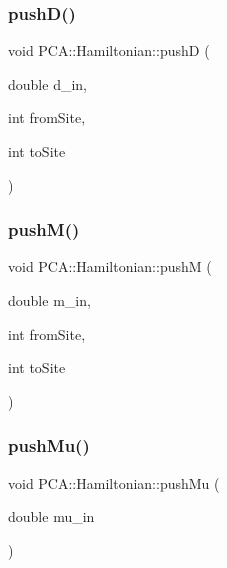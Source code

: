 \hypertarget{class_p_c_a_1_1_hamiltonian_a8f0f25f18c67f7943714d086737e427f}{}\label{class_p_c_a_1_1_hamiltonian_a8f0f25f18c67f7943714d086737e427f} 
\subsubsection{\texorpdfstring{push\+D()}{pushD()}}
{\footnotesize\ttfamily void P\+C\+A\+::\+Hamiltonian\+::pushD (\begin{DoxyParamCaption}\item[{double}]{d\+\_\+in,  }\item[{int}]{from\+Site,  }\item[{int}]{to\+Site }\end{DoxyParamCaption})}

\hypertarget{class_p_c_a_1_1_hamiltonian_a65c8f6848095abff386aa04a916b0c81}{}\label{class_p_c_a_1_1_hamiltonian_a65c8f6848095abff386aa04a916b0c81} 
\subsubsection{\texorpdfstring{push\+M()}{pushM()}}
{\footnotesize\ttfamily void P\+C\+A\+::\+Hamiltonian\+::pushM (\begin{DoxyParamCaption}\item[{double}]{m\+\_\+in,  }\item[{int}]{from\+Site,  }\item[{int}]{to\+Site }\end{DoxyParamCaption})}

\hypertarget{class_p_c_a_1_1_hamiltonian_a98a0769af6bbaae97843e821b9b516a1}{}\label{class_p_c_a_1_1_hamiltonian_a98a0769af6bbaae97843e821b9b516a1} 
\subsubsection{\texorpdfstring{push\+Mu()}{pushMu()}}
{\footnotesize\ttfamily void P\+C\+A\+::\+Hamiltonian\+::push\+Mu (\begin{DoxyParamCaption}\item[{double}]{mu\+\_\+in }\end{DoxyParamCaption})}

